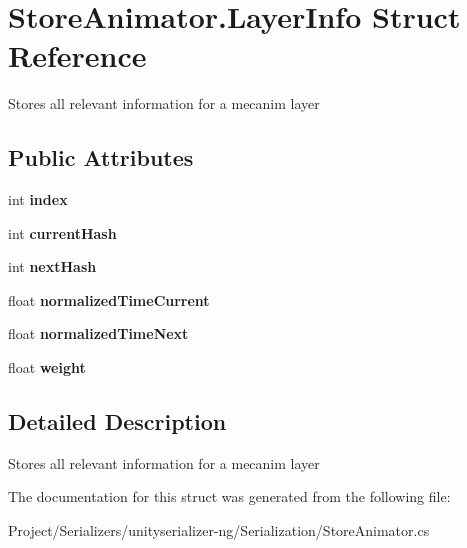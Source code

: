 \hypertarget{struct_store_animator_1_1_layer_info}{}\section{Store\+Animator.\+Layer\+Info Struct Reference}
\label{struct_store_animator_1_1_layer_info}


Stores all relevant information for a mecanim layer  


\subsection*{Public Attributes}
\begin{DoxyCompactItemize}
\item 
\mbox{\label{struct_store_animator_1_1_layer_info_af303a16a21f20bdd26884b4fdad45477}} 
int {\bfseries index}
\item 
\mbox{\label{struct_store_animator_1_1_layer_info_a4365d5697b3f9758a90b026afc0168ab}} 
int {\bfseries current\+Hash}
\item 
\mbox{\label{struct_store_animator_1_1_layer_info_a08bbba599699b128afeb9a220db8531c}} 
int {\bfseries next\+Hash}
\item 
\mbox{\label{struct_store_animator_1_1_layer_info_aefafcf918c87ff69c3d9be4ac28b1b48}} 
float {\bfseries normalized\+Time\+Current}
\item 
\mbox{\label{struct_store_animator_1_1_layer_info_a62c108e0250f58785ad34ef05e60bc7b}} 
float {\bfseries normalized\+Time\+Next}
\item 
\mbox{\label{struct_store_animator_1_1_layer_info_aeaf503da3e14828bb6bc9e64051457fb}} 
float {\bfseries weight}
\end{DoxyCompactItemize}


\subsection{Detailed Description}
Stores all relevant information for a mecanim layer 



The documentation for this struct was generated from the following file\+:\begin{DoxyCompactItemize}
\item 
Project/\+Serializers/unityserializer-\/ng/\+Serialization/Store\+Animator.\+cs\end{DoxyCompactItemize}
